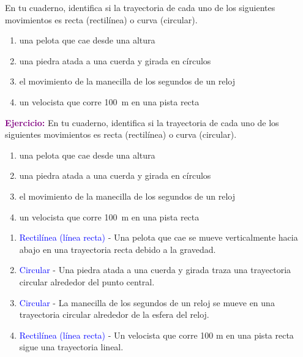 \begin{exercise}
    En tu cuaderno, identifica si la trayectoria de cada uno de los siguientes movimientos es recta (rectilínea) o curva (circular).
    \begin{enumerate}[label=\letraminuscula]
        \item una pelota que cae desde una altura
        \item una piedra atada a una cuerda y girada en círculos
        \item el movimiento de la manecilla de los segundos de un reloj
        \item un velocista que corre \qty{100}{\metre} en una pista recta
    \end{enumerate}
    \begin{solu}
        \textbf{\textcolor{purple}{Ejercicio:}} En tu cuaderno, identifica si la trayectoria de cada uno de los siguientes movimientos es recta (rectilínea) o curva (circular).
        \begin{enumerate}[label=\letraminuscula]
            \item una pelota que cae desde una altura
            \item una piedra atada a una cuerda y girada en círculos
            \item el movimiento de la manecilla de los segundos de un reloj
            \item un velocista que corre \qty{100}{\metre} en una pista recta
        \end{enumerate}

        \vspace{0.3cm}

        \begin{enumerate}[label=\letraminuscula]
            \item \textcolor{blue}{Rectilínea (línea recta)} - Una pelota que cae se mueve verticalmente hacia abajo en una trayectoria recta debido a la gravedad.
            \item \textcolor{blue}{Circular} - Una piedra atada a una cuerda y girada traza una trayectoria circular alrededor del punto central.
            \item \textcolor{blue}{Circular} - La manecilla de los segundos de un reloj se mueve en una trayectoria circular alrededor de la esfera del reloj.
            \item \textcolor{blue}{Rectilínea (línea recta)} - Un velocista que corre 100 m en una pista recta sigue una trayectoria lineal.
        \end{enumerate}
    \end{solu}
\end{exercise}

